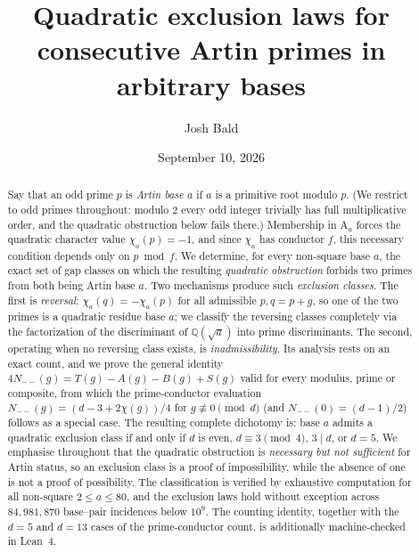 \documentclass[11pt,reqno]{amsart}
\theoremstyle{plain}
\theoremstyle{definition}
\newcommand{\Art}{\mathrm{A}}
\newcommand{\Q}{\mathbb{Q}}
\begin{document}
\title[Quadratic exclusion laws for consecutive Artin primes]
{Quadratic exclusion laws for consecutive Artin primes in arbitrary bases}

\author{Josh Bald}
\address{Ontario, Canada}


\date{September 10, 2026}

\begin{abstract}
Say that an odd prime $p$ is \emph{Artin base $a$} if $a$ is a primitive root
modulo $p$. (We restrict to odd primes throughout: modulo $2$ every odd
integer trivially has full multiplicative order, and the quadratic obstruction
below fails there.) Membership in $\Art_a$ forces the quadratic character value
$\chi_a(p) = -1$, and since $\chi_a$ has conductor $f$, this necessary
condition depends only on $p \bmod f$. We determine, for every non-square base
$a$, the exact set of gap classes on which the resulting \emph{quadratic
obstruction} forbids two primes from both being Artin base $a$. Two mechanisms
produce such \emph{exclusion classes}. The first is \emph{reversal}:
$\chi_a(q) = -\chi_a(p)$ for all admissible $p, q = p + g$, so one of the two
primes is a quadratic residue base $a$; we classify the reversing classes
completely via the factorization of the discriminant of $\Q(\sqrt{a})$ into
prime discriminants. The second, operating when no reversing class exists, is
\emph{inadmissibility}. Its analysis rests on an exact count, and we prove the
general identity
$4 N_{--}(g) = T(g) - A(g) - B(g) + S(g)$
valid for every modulus, prime or composite, from which the prime-conductor
evaluation $N_{--}(g) = (d - 3 + 2\chi(g))/4$ for $g \not\equiv 0 \pmod d$ (and
$N_{--}(0) = (d-1)/2$) follows as a special case. The resulting complete
dichotomy is: base $a$ admits a quadratic exclusion class if and only if $d$ is
even, $d \equiv 3 \pmod 4$, $3 \mid d$, or $d = 5$. We emphasise throughout
that the quadratic obstruction is \emph{necessary but not sufficient} for
Artin status, so an exclusion class is a proof of impossibility, while the
absence of one is not a proof of possibility. The classification is verified
by exhaustive computation for all non-square $2 \le a \le 80$, and the
exclusion laws hold without exception across $84{,}981{,}870$ base--pair
incidences below $10^9$. The counting identity, together with the
$d = 5$ and $d = 13$ cases of the prime-conductor count, is additionally
machine-checked in Lean~4.


\end{abstract}
\end{document}

